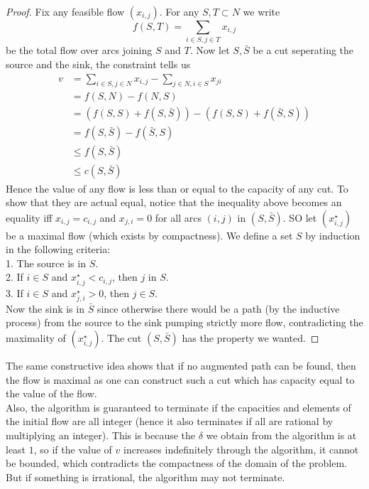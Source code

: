 \begin{proof}
    Fix any feasible flow $(x_{i,j})$.
    For any $S,T\subset N$ we write
    $$f(S,T)=\sum_{i\in S,j\in T}x_{i,j}$$
    be the total flow over arcs joining $S$ and $T$.
    Now let $S,\bar{S}$ be a cut seperating the source and the sink, the constraint tells us
    \begin{align*}
        v&=\sum_{i\in S,j\in N}x_{i,j}-\sum_{j\in N,i\in S}x_{ji}\\
        &=f(S,N)-f(N,S)\\
        &=(f(S,S)+f(S,\bar{S}))-(f(S,S)+f(\bar{S},S))\\
        &=f(S,\bar{S})-f(\bar{S},S)\\
        &\le f(S,\bar{S})\\
        &\le c(S,\bar{S})
    \end{align*}
    Hence the value of any flow is less than or equal to the capacity of any cut.
    To show that they are actual equal, notice that the inequality above becomes an equality iff $x_{i,j}=c_{i,j}$ and $x_{j,i}=0$ for all arcs $(i,j)$ in $(S,\bar{S})$.
    SO let $(x_{i,j}^\star)$ be a maximal flow (which exists by compactness).
    We define a set $S$ by induction in the following criteria:\\
    1. The source is in $S$.\\
    2. If $i\in S$ and $x_{i,j}^\star<c_{i,j}$, then $j$ in $S$.\\
    3. If $i\in S$ and $x_{j,i}^\star>0$, then $j\in S$.\\
    Now the sink is in $\bar S$ since otherwise there would be a path (by the inductive process) from the source to the sink pumping strictly more flow, contradicting the maximality of $(x_{i,j}^\star)$.
    The cut $(S,\bar{S})$ has the property we wanted.
\end{proof}
The same constructive idea shows that if no augmented path can be found, then the flow is maximal as one can construct such a cut which has capacity equal to the value of the flow.\\
Also, the algorithm is guaranteed to terminate if the capacities and elements of the initial flow are all integer (hence it also terminates if all are rational by multiplying an integer).
This is because the $\delta$ we obtain from the algorithm is at least $1$, so if the value of $v$ increases indefinitely through the algorithm, it cannot be bounded, which contradicts the compactness of the domain of the problem.
But if something is irrational, the algorithm may not terminate.
